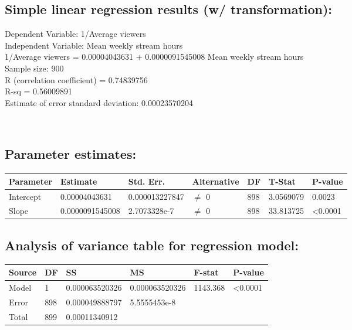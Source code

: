 \documentclass[
]{article}
\author{}
\date{}
\begin{document}
\subsection{Simple linear regression results (w/
transformation):}\label{simple-linear-regression-results-w-transformation}

\hfill\break
Dependent Variable: 1/Average viewers\\
Independent Variable: Mean weekly stream hours\\
1/Average viewers = 0.00004043631 + 0.0000091545008 Mean weekly stream
hours\\
Sample size: 900\\
R (correlation coefficient) = 0.74839756\\
R-sq = 0.56009891\\
Estimate of error standard deviation: 0.00023570204\\
\strut \\

\subsection{Parameter estimates:}\label{parameter-estimates}

\hfill\break

\begin{longtable}[]{@{}lllllll@{}}
\toprule\noalign{}
Parameter & Estimate & Std. Err. & Alternative & DF & T-Stat &
P-value \\
\midrule\noalign{}
\endhead
\bottomrule\noalign{}
\endlastfoot
Intercept & 0.00004043631 & 0.000013227847 & $\neq$ 0 & 898 & 3.0569079 &
0.0023 \\
Slope & 0.0000091545008 & 2.7073328e-7 & $\neq$ 0 & 898 & 33.813725 &
\textless0.0001 \\
\end{longtable}

\hfill\break

\subsection{Analysis of variance table for regression
model:}\label{analysis-of-variance-table-for-regression-model}

\hfill\break

\begin{longtable}[]{@{}llllll@{}}
\toprule\noalign{}
Source & DF & SS & MS & F-stat & P-value \\
\midrule\noalign{}
\endhead
\bottomrule\noalign{}
\endlastfoot
Model & 1 & 0.000063520326 & 0.000063520326 & 1143.368 &
\textless0.0001 \\
Error & 898 & 0.000049888797 & 5.5555453e-8 & & \\
Total & 899 & 0.00011340912 & & & \\
\end{longtable}
\end{document}
